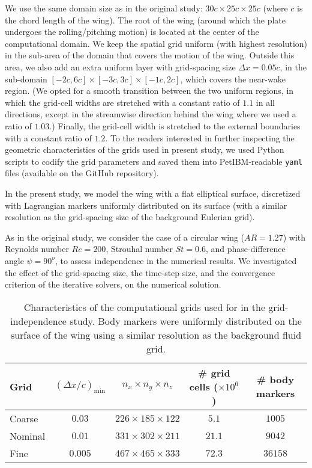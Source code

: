 We use the same domain size as in the original study: $30c \times 25c \times 25c$ (where $c$ is the chord length of the wing).
The root of the wing (around which the plate undergoes the rolling/pitching motion) is located at the center of the computational domain.
We keep the spatial grid uniform (with highest resolution) in the sub-area of the domain that covers the motion of the wing.
Outside this area, we also add an extra uniform layer with grid-spacing size $\Delta x = 0.05c$, in the sub-domain $\left[ -2c, 6c \right] \times \left[ -3c, 3c \right] \times \left[ -1c, 2c \right]$, which covers the near-wake region.
(We opted for a smooth transition between the two uniform regions, in which the grid-cell widths are stretched with a constant ratio of $1.1$ in all directions, except in the streamwise direction behind the wing where we used a ratio of $1.03$.)
Finally, the grid-cell width is stretched to the external boundaries with a constant ratio of $1.2$.
To the readers interested in further inspecting the geometric characteristics of the grids used in present study, we used Python scripts to codify the grid parameters and saved them into PetIBM-readable \texttt{yaml} files (available on the GitHub repository).

In the present study, we model the wing with a flat elliptical surface, discretized with Lagrangian markers uniformly distributed on its surface (with a similar resolution as the grid-spacing size of the background Eulerian grid).

As in the original study, we consider the case of a circular wing ($AR = 1.27$) with Reynolds number $Re = 200$, Strouhal number $St = 0.6$, and phase-difference angle $\psi = 90^o$, to assess independence in the numerical results.
We investigated the effect of the grid-spacing size, the time-step size, and the convergence criterion of the iterative solvers, on the numerical solution.

\begin{table}[!h]
  \centering
  \begin{tabular}{lcccc}
    \hline\hline
    Grid & $(\Delta x / c)_\text{min}$ & $n_x \times n_y \times n_z$ & \# grid cells ($\times 10^6$) & \# body markers \\
    \hline
    Coarse & $0.03$ & $226 \times 185 \times 122$ & $5.1$ & $1005$ \\
    Nominal & $0.01$ & $331 \times 302 \times 211$ & $21.1$ & $9042$ \\
    Fine & $0.005$ & $467 \times 465 \times 333$ & $72.3$ & $36158$ \\
    \hline\hline
  \end{tabular}
  \caption{Characteristics of the computational grids used for in the grid-independence study. Body markers were uniformly distributed on the surface of the wing using a similar resolution as the background fluid grid.}
  \label{tab:independence_grid_charateristics}
\end{table}

